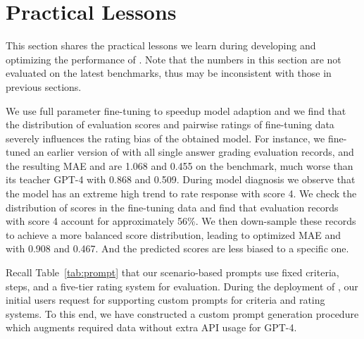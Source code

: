 \section{Practical Lessons}
\label{sec:lessons}

This section shares the practical lessons we learn during developing and optimizing the performance of \modelname. Note that the numbers in this section are not evaluated on the latest benchmarks, thus may be inconsistent with those in previous sections.

We use full parameter fine-tuning to speedup model adaption and we find that the distribution of evaluation scores and pairwise ratings of fine-tuning data severely influences the rating bias of the obtained model. For instance, we fine-tuned an earlier version of \modelname with all single answer grading evaluation records, and the resulting MAE and  are 1.068 and 0.455 on the \aligndata benchmark, much worse than its teacher GPT-4 with 0.868 and 0.509. During model diagnosis we observe that the model has an extreme high trend to rate response with score 4. We check the distribution of scores in the fine-tuning data and find that evaluation records with score 4 account for approximately 56\%. We then down-sample these records to achieve a more balanced score distribution, leading to optimized MAE and  with 0.908 and 0.467. And the predicted scores are less biased to a specific one.




Recall Table~\ref{tab:prompt} that our scenario-based prompts use fixed criteria, steps, and a five-tier rating system for evaluation. During the deployment of \modelname, our initial users request for supporting custom prompts for criteria and rating systems. To this end, we have constructed a custom prompt generation procedure which augments required data without extra API usage for GPT-4.



